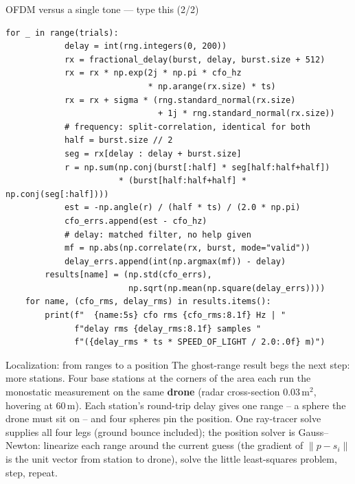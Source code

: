 \documentclass[10pt]{beamer}
\begin{document}
\begin{frame}[fragile]{OFDM versus a single tone --- type this (2/2)}
\begin{lstlisting}[basicstyle=\ttfamily\tiny]
        for _ in range(trials):
            delay = int(rng.integers(0, 200))
            rx = fractional_delay(burst, delay, burst.size + 512)
            rx = rx * np.exp(2j * np.pi * cfo_hz
                             * np.arange(rx.size) * ts)
            rx = rx + sigma * (rng.standard_normal(rx.size)
                               + 1j * rng.standard_normal(rx.size))
            # frequency: split-correlation, identical for both
            half = burst.size // 2
            seg = rx[delay : delay + burst.size]
            r = np.sum(np.conj(burst[:half] * seg[half:half+half])
                       * (burst[half:half+half] * np.conj(seg[:half])))
            est = -np.angle(r) / (half * ts) / (2.0 * np.pi)
            cfo_errs.append(est - cfo_hz)
            # delay: matched filter, no help given
            mf = np.abs(np.correlate(rx, burst, mode="valid"))
            delay_errs.append(int(np.argmax(mf)) - delay)
        results[name] = (np.std(cfo_errs),
                         np.sqrt(np.mean(np.square(delay_errs))))
    for name, (cfo_rms, delay_rms) in results.items():
        print(f"  {name:5s} cfo rms {cfo_rms:8.1f} Hz | "
              f"delay rms {delay_rms:8.1f} samples "
              f"({delay_rms * ts * SPEED_OF_LIGHT / 2.0:.0f} m)")
\end{lstlisting}
\end{frame}

\begin{frame}{Localization: from ranges to a position}
  The ghost-range result begs the next step: more stations.
  Four base stations at the corners of the area each run
  the monostatic measurement on the same \textbf{drone}
  (radar cross-section 0.03\,m$^2$, hovering at 60\,m).
  Each station's round-trip delay gives one range -- a
  sphere the drone must sit on -- and four spheres pin the
  position. One ray-tracer solve supplies all four legs
  (ground bounce included); the position solver is
  Gauss--Newton: linearize each range around the current
  guess (the gradient of $\|p - s_i\|$ is the unit vector
  from station to drone), solve the little least-squares
  problem, step, repeat.
\end{frame}
\end{document}
